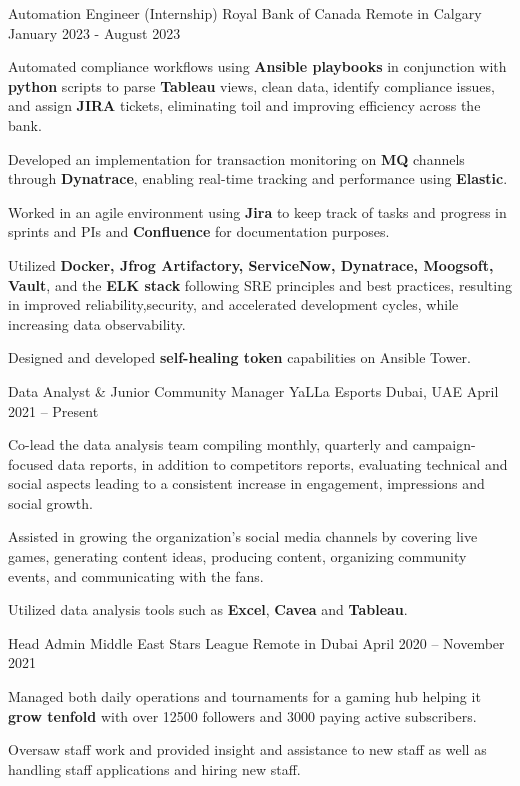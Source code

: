\documentclass[]{awesome-cv}
\begin{document}
\vspace{-2mm}
\begin{cventries}
	\cventry
	{Automation Engineer (Internship)}
	{Royal Bank of Canada}
	{Remote in Calgary}
	{January 2023 - August 2023}
	{\begin{cvitems}
		\item {Automated compliance workflows using \textbf{Ansible playbooks} in conjunction with \textbf{python} scripts to parse \textbf{Tableau} views, clean data, identify compliance issues, and assign \textbf{JIRA} tickets, eliminating toil and improving efficiency across the bank.}
		\item {Developed an implementation for transaction monitoring on \textbf{MQ} channels through \textbf{Dynatrace}, enabling real-time tracking and performance using \textbf{Elastic}.}
		\item {Worked in an agile environment using \textbf{Jira} to keep track of tasks and progress in sprints and PIs and \textbf{Confluence} for documentation purposes.}
  		\item {Utilized \textbf{Docker, Jfrog Artifactory, ServiceNow, Dynatrace, Moogsoft, Vault}, and the \textbf{ELK stack} following SRE principles and best practices, resulting in improved reliability,security, and accelerated development cycles, while increasing data observability.}
		\item {Designed and developed \textbf{self-healing token} capabilities on Ansible Tower.}
		\end{cvitems}}
		\vspace{1mm}
  
	\cventry
	{Data Analyst \& Junior Community Manager}
	{YaLLa Esports}
	{Dubai, UAE}
	{April 2021 – Present}
	{\begin{cvitems}
		\item {Co-lead the data analysis team compiling monthly, quarterly and campaign-focused data reports, in addition to competitors reports, evaluating technical and social aspects leading to a consistent increase in engagement, impressions and social growth.}
		\item {Assisted in growing the organization's social media channels by covering live games, generating content ideas, producing content, organizing community events, and communicating with the fans.}
  		\item {Utilized data analysis tools such as \textbf{Excel}, \textbf{Cavea} and \textbf{Tableau}.}
		\end{cvitems}}
		\vspace{1mm}
	\cventry
	{Head Admin}
	{Middle East Stars League}
	{Remote in Dubai}
	{April 2020 – November 2021}
	{\begin{cvitems}
		\item {Managed both daily operations and tournaments for a gaming hub helping it \textbf{grow tenfold} with over 12500 followers and 3000 paying active subscribers.}
		\item {Oversaw staff work and provided insight and assistance to new staff as well as handling staff applications and hiring new staff.}
		\end{cvitems}}


\end{cventries}
\end{document}
